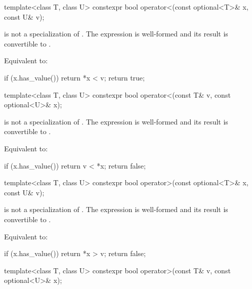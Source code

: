 %
\begin{itemdecl}
template<class T, class U>
  constexpr bool operator<(const optional<T>& x, const U& v);
\end{itemdecl}

\begin{itemdescr}
\pnum
\constraints
{} is not a specialization of . The expression  is well-formed and its result is convertible to .

\pnum
\effects
Equivalent to:
\begin{codeblock}
if (x.has_value())
  return *x < v;
return true;
\end{codeblock}
\end{itemdescr}

%
\begin{itemdecl}
template<class T, class U>
  constexpr bool operator<(const T& v, const optional<U>& x);
\end{itemdecl}

\begin{itemdescr}
\pnum
\constraints
{} is not a specialization of . The expression  is well-formed and its result is convertible to .

\pnum
\effects
Equivalent to:
\begin{codeblock}
if (x.has_value())
  return v < *x;
return false;
\end{codeblock}
\end{itemdescr}

%
\begin{itemdecl}
template<class T, class U>
  constexpr bool operator>(const optional<T>& x, const U& v);
\end{itemdecl}

\begin{itemdescr}
\pnum
\constraints
{} is not a specialization of . The expression  is well-formed and its result is convertible to .

\pnum
\effects
Equivalent to:
\begin{codeblock}
if (x.has_value())
  return *x > v;
return false;
\end{codeblock}
\end{itemdescr}

%
\begin{itemdecl}
template<class T, class U>
  constexpr bool operator>(const T& v, const optional<U>& x);
\end{itemdecl}

